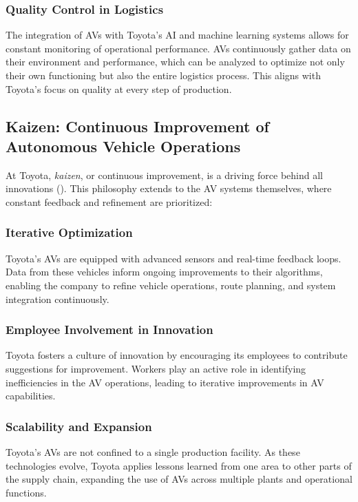 \subsubsection{Quality Control in Logistics}
The integration of AVs with Toyota’s AI and machine learning systems allows for constant monitoring of operational performance. AVs continuously gather data on their environment and performance, which can be analyzed to optimize not only their own functioning but also the entire logistics process. This aligns with Toyota's focus on quality at every step of production.

\subsection{Kaizen: Continuous Improvement of Autonomous Vehicle Operations}

At Toyota, \textit{kaizen}, or continuous improvement, is a driving force behind all innovations (\cite{Clifford_2021}). This philosophy extends to the AV systems themselves, where constant feedback and refinement are prioritized:

\subsubsection{Iterative Optimization}
Toyota’s AVs are equipped with advanced sensors and real-time feedback loops. Data from these vehicles inform ongoing improvements to their algorithms, enabling the company to refine vehicle operations, route planning, and system integration continuously.

\subsubsection{Employee Involvement in Innovation}
Toyota fosters a culture of innovation by encouraging its employees to contribute suggestions for improvement. Workers play an active role in identifying inefficiencies in the AV operations, leading to iterative improvements in AV capabilities.

\subsubsection{Scalability and Expansion}
Toyota's AVs are not confined to a single production facility. As these technologies evolve, Toyota applies lessons learned from one area to other parts of the supply chain, expanding the use of AVs across multiple plants and operational functions.

